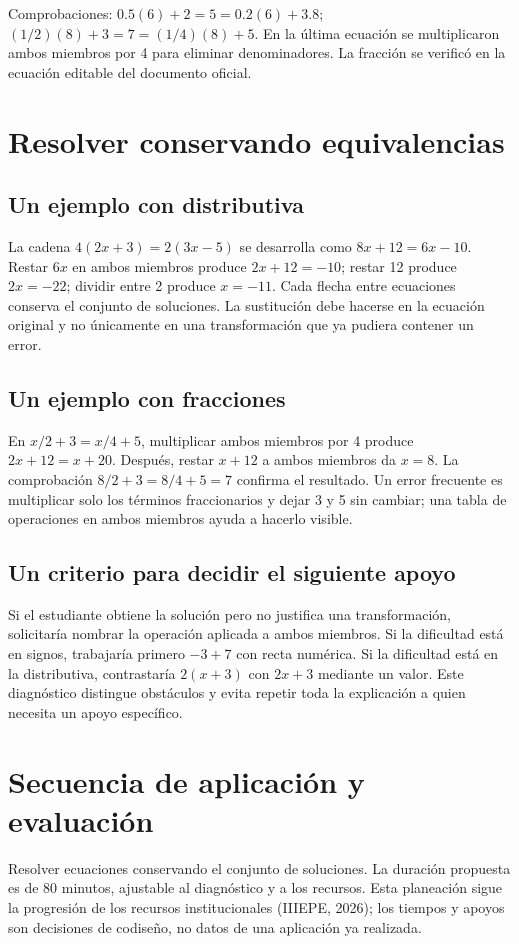 \documentclass[spanish,letterpaper,oneside]{article}
\begin{document}
Comprobaciones: $0.5(6)+2=5=0.2(6)+3.8$; $(1/2)(8)+3=7=(1/4)(8)+5$. En la última ecuación se multiplicaron ambos miembros por 4 para eliminar denominadores. La fracción se verificó en la ecuación editable del documento oficial.
\section{Resolver conservando equivalencias}
\subsection{Un ejemplo con distributiva}
La cadena $4(2x+3)=2(3x-5)$ se desarrolla como $8x+12=6x-10$. Restar $6x$ en ambos miembros produce $2x+12=-10$; restar 12 produce $2x=-22$; dividir entre 2 produce $x=-11$. Cada flecha entre ecuaciones conserva el conjunto de soluciones. La sustitución debe hacerse en la ecuación original y no únicamente en una transformación que ya pudiera contener un error.
\subsection{Un ejemplo con fracciones}
En $x/2+3=x/4+5$, multiplicar ambos miembros por 4 produce $2x+12=x+20$. Después, restar $x+12$ a ambos miembros da $x=8$. La comprobación $8/2+3=8/4+5=7$ confirma el resultado. Un error frecuente es multiplicar solo los términos fraccionarios y dejar 3 y 5 sin cambiar; una tabla de operaciones en ambos miembros ayuda a hacerlo visible.
\subsection{Un criterio para decidir el siguiente apoyo}
Si el estudiante obtiene la solución pero no justifica una transformación, solicitaría nombrar la operación aplicada a ambos miembros. Si la dificultad está en signos, trabajaría primero $-3+7$ con recta numérica. Si la dificultad está en la distributiva, contrastaría $2(x+3)$ con $2x+3$ mediante un valor. Este diagnóstico distingue obstáculos y evita repetir toda la explicación a quien necesita un apoyo específico.
\section{Secuencia de aplicación y evaluación}
Resolver ecuaciones conservando el conjunto de soluciones. La duración propuesta es de 80 minutos, ajustable al diagnóstico y a los recursos. Esta planeación sigue la progresión de los recursos institucionales (IIIEPE, 2026); los tiempos y apoyos son decisiones de codiseño, no datos de una aplicación ya realizada.
\end{document}
